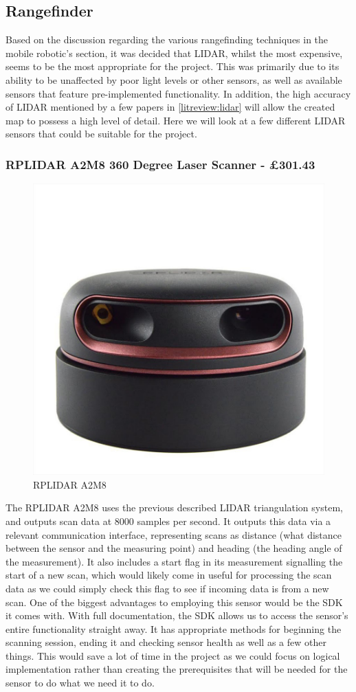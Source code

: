 				\subsection{Rangefinder}
				Based on the discussion regarding the various rangefinding techniques in the mobile robotic's section, it was decided that LIDAR, whilst the most expensive, seems to be the most appropriate for the project. This was primarily due to its ability to be unaffected by poor light levels or other sensors, as well as available sensors that feature pre-implemented functionality. In addition, the high accuracy of LIDAR mentioned by a few papers in \ref{litreview:lidar} will allow the created map to possess a high level of detail. Here we will look at a few different LIDAR sensors that could be suitable for the project.
				
					\subsubsection{RPLIDAR A2M8 360 Degree Laser Scanner - \pounds{301.43}}
					\begin{figure}[h]
						\centering
						\includegraphics[width=.3\linewidth]{ANALYSIS/rplidara2.jpg}
						\caption{RPLIDAR A2M8}
						\label{fig:rplidara2m8}
					\end{figure}
					The RPLIDAR A2M8 uses the previous described LIDAR triangulation system, and outputs scan data at 8000 samples per second\citep{rplida2m8docs}. It outputs this data via a relevant communication interface, representing scans as distance (what distance between the sensor and the measuring point) and heading (the heading angle of the measurement). It also includes a start flag in its measurement signalling the start of a new scan, which would likely come in useful for processing the scan data as we could simply check this flag to see if incoming data is from a new scan. One of the biggest advantages to employing this sensor would be the SDK it comes with. With full documentation\cite{rplidarsdkdocs}, the SDK allows us to access the sensor's entire functionality straight away. It has appropriate methods for beginning the scanning session, ending it and checking sensor health as well as a few other things. This would save a lot of time in the project as we could focus on logical implementation rather than creating the prerequisites that will be needed for the sensor to do what we need it to do.
					
